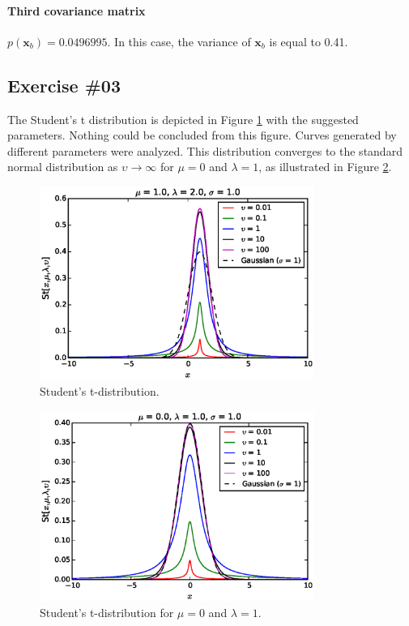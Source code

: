 \documentclass[a4paper,12pt]{article}
\newcommand{\mb}[1]{\ensuremath{\mathbf{#1}}}
\begin{document}
\paragraph{Third covariance matrix}  $p(\mb{x}_b) = 0.0496995$. In this case, the variance of $\mb{x}_b$ is equal to 0.41.

\subsection*{Exercise \#03}
The Student's t distribution is depicted in Figure \ref{fig:3f2} with the suggested parameters. Nothing could be concluded from this figure. Curves generated by different parameters were analyzed. This distribution converges to the standard normal distribution as $\upsilon \rightarrow \infty$ for $\mu=0$ and $\lambda=1$, as illustrated in Figure \ref{fig:3f1}.
\begin{figure}[htb]
 \centering
 \includegraphics[width=0.8\textwidth]{./figures/3f2.eps}
 \caption{Student's t-distribution.}
 \label{fig:3f2}
\end{figure}
\begin{figure}[htb]
 \centering
 \includegraphics[width=0.8\textwidth]{./figures/3f1.eps}
 \caption{Student's t-distribution for $\mu=0$ and $\lambda=1$.}
 \label{fig:3f1}
\end{figure}
\end{document}
